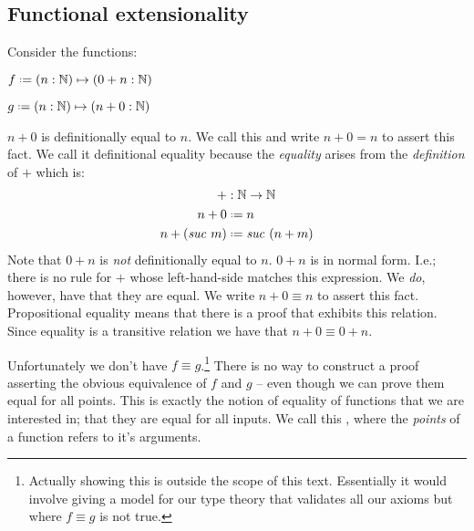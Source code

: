 \documentclass{article}
\begin{document}
\subsection{Functional extensionality}
Consider the functions:
%
\begin{multicols}{2}
$f \defeq (n : \bN) \mapsto (0 + n : \bN)$

$g \defeq (n : \bN) \mapsto (n + 0 : \bN)$
\end{multicols}
%
$n + 0$ is definitionally equal to $n$. We call this  and write $n + 0 = n$ to assert this fact. We call it definitional
equality because the \emph{equality} arises from the \emph{definition} of $+$
which is:
%
\newcommand{\suc}[1]{\mathit{suc}\ #1}
\begin{align*}
  +           & : \bN \to \bN              \\
  n + 0       & \defeq n                   \\
  n + (\suc{m}) & \defeq \suc{(n + m)}
\end{align*}
%
Note that $0 + n$ is \emph{not} definitionally equal to $n$. $0 + n$ is in
normal form. I.e.; there is no rule for $+$ whose left-hand-side matches this
expression. We \emph{do}, however, have that they are 
equal. We write $n + 0 \equiv n$ to assert this fact. Propositional equality
means that there is a proof that exhibits this relation. Since equality is a
transitive relation we have that $n + 0 \equiv 0 + n$.

Unfortunately we don't have $f \equiv g$.\footnote{Actually showing this is
outside the scope of this text. Essentially it would involve giving a model
for our type theory that validates all our axioms but where $f \equiv g$ is
not true.} There is no way to construct a proof asserting the obvious
equivalence of $f$ and $g$ -- even though we can prove them equal for all
points. This is exactly the notion of equality of functions that we are
interested in; that they are equal for all inputs. We call this
, where the \emph{points} of a function refers
to it's arguments.
\end{document}
